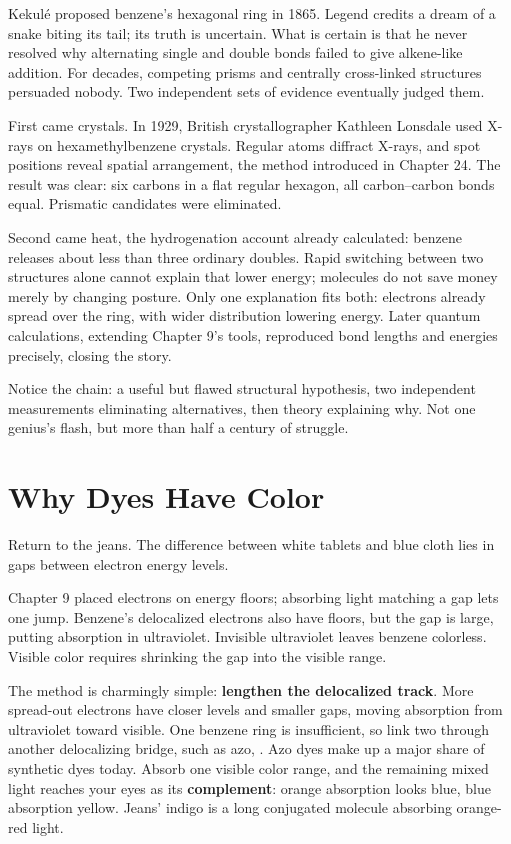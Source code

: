 \begin{zhengju}
Kekulé proposed benzene's hexagonal ring in 1865. Legend credits a dream of a snake biting its tail; its truth is uncertain. What is certain is that he never resolved why alternating single and double bonds failed to give alkene-like addition. For decades, competing prisms and centrally cross-linked structures persuaded nobody. Two independent sets of evidence eventually judged them.

First came crystals. In 1929, British crystallographer Kathleen Lonsdale used X-rays on hexamethylbenzene crystals. Regular atoms diffract X-rays, and spot positions reveal spatial arrangement, the method introduced in Chapter 24. The result was clear: six carbons in a flat regular hexagon, all carbon--carbon bonds equal. Prismatic candidates were eliminated.

Second came heat, the hydrogenation account already calculated: benzene releases about  less than three ordinary doubles. Rapid switching between two structures alone cannot explain that lower energy; molecules do not save money merely by changing posture. Only one explanation fits both: electrons already spread over the ring, with wider distribution lowering energy. Later quantum calculations, extending Chapter 9's tools, reproduced bond lengths and energies precisely, closing the story.

Notice the chain: a useful but flawed structural hypothesis, two independent measurements eliminating alternatives, then theory explaining why. Not one genius's flash, but more than half a century of struggle.
\end{zhengju}
\section{Why Dyes Have Color}

Return to the jeans. The difference between white tablets and blue cloth lies in gaps between electron energy levels.

Chapter 9 placed electrons on energy floors; absorbing light matching a gap lets one jump. Benzene's delocalized electrons also have floors, but the gap is large, putting absorption in ultraviolet. Invisible ultraviolet leaves benzene colorless. Visible color requires shrinking the gap into the visible range.

The method is charmingly simple: \textbf{lengthen the delocalized track}. More spread-out electrons have closer levels and smaller gaps, moving absorption from ultraviolet toward visible. One benzene ring is insufficient, so link two through another delocalizing bridge, such as azo, . Azo dyes make up a major share of synthetic dyes today. Absorb one visible color range, and the remaining mixed light reaches your eyes as its \textbf{complement}: orange absorption looks blue, blue absorption yellow. Jeans' indigo is a long conjugated molecule absorbing orange-red light.

